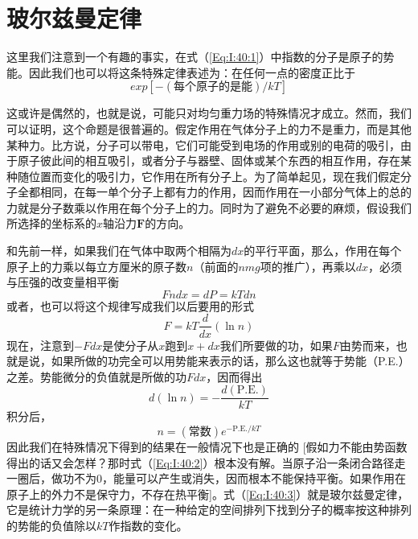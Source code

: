 \section{玻尔兹曼定律}

这里我们注意到一个有趣的事实，在式（\ref{Eq:I:40:1}）中指数的分子是原子的势能。因此我们也可以将这条特殊定律表述为：在任何一点的密度正比于
\begin{equation*}
    exp[-(\text{每个原子的是能})/kT]
\end{equation*}

这或许是偶然的，也就是说，可能只对均匀重力场的特殊情况才成立。然而，我们可以证明，这个命题是很普遍的。假定作用在气体分子上的力不是重力，而是其他某种力。比方说，分子可以带电，它们可能受到电场的作用或别的电荷的吸引，由于原子彼此间的相互吸引，或者分子与器壁、固体或某个东西的相互作用，存在某种随位置而变化的吸引力，它作用在所有分子上。为了简单起见，现在我们假定分子全都相同，在每一单个分子上都有力的作用，因而作用在一小部分气体上的总的力就是分子数乘以作用在每个分子上的力。同时为了避免不必要的麻烦，假设我们所选择的坐标系的$x$轴沿力$\boldsymbol{F}$的方向。

和先前一样，如果我们在气体中取两个相隔为$dx$的平行平面，那么，作用在每个原子上的力乘以每立方厘米的原子数$n$（前面的$nmg$项的推广），再乘以$dx$，必须与压强的改变量相平衡
\begin{equation*}
    Fndx = dP = kTdn
\end{equation*}
或者，也可以将这个规律写成我们以后要用的形式
\begin{equation}
    \label{Eq:I:40:2}
    F = kT\frac{d}{dx}(\ln n)
\end{equation}
现在，注意到$-Fdx$是使分子从$x$跑到$x+dx$我们所要做的功，如果$F$由势而来，也就是说，如果所做的功完全可以用势能来表示的话，那么这也就等于势能（P.E.）之差。势能微分的负值就是所做的功$Fdx$，因而得出
\begin{equation*}
    d(\ln n) = -\frac{d(\text{P.E.})}{kT}
\end{equation*}
积分后，
\begin{equation}
    \label{Eq:I:40:3}
    n = (\text{常数})e^{-\text{P.E.}/kT}
\end{equation}
因此我们在特殊情况下得到的结果在一般情况下也是正确的 [假如力不能由势函数得出的话又会怎样？那时式（\ref{Eq:I:40:2}）根本没有解。当原子沿一条闭合路径走一圈后，做功不为$0$，能量可以产生或消失，因而根本不能保持平衡。如果作用在原子上的外力不是保守力，不存在热平衡]。式（\ref{Eq:I:40:3}）就是玻尔兹曼定律，它是统计力学的另一条原理：在一种给定的空间排列下找到分子的概率按这种排列的势能的负值除以$kT$作指数的变化。

